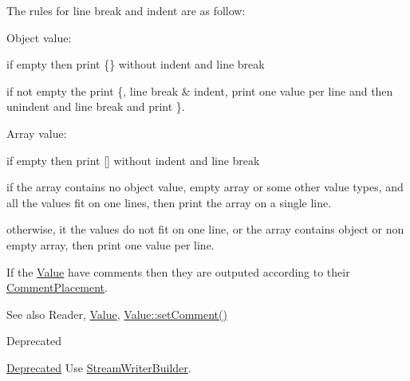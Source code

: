 The rules for line break and indent are as follow\+:
\begin{DoxyItemize}
\item Object value\+:
\begin{DoxyItemize}
\item if empty then print \{\} without indent and line break
\item if not empty the print \textquotesingle{}\{\textquotesingle{}, line break \& indent, print one value per line and then unindent and line break and print \textquotesingle{}\}\textquotesingle{}.
\end{DoxyItemize}
\item Array value\+:
\begin{DoxyItemize}
\item if empty then print \mbox{[}\mbox{]} without indent and line break
\item if the array contains no object value, empty array or some other value types, and all the values fit on one lines, then print the array on a single line.
\item otherwise, it the values do not fit on one line, or the array contains object or non empty array, then print one value per line.
\end{DoxyItemize}
\end{DoxyItemize}

If the \hyperlink{classJson_1_1Value}{Value} have comments then they are outputed according to their \hyperlink{namespaceJson_a4fc417c23905b2ae9e2c47d197a45351}{Comment\+Placement}.

\begin{DoxySeeAlso}{See also}
Reader, \hyperlink{classJson_1_1Value}{Value}, \hyperlink{classJson_1_1Value_a29f3a30f7e5d3af6f38d57999bf5b480}{Value\+::set\+Comment()} 
\end{DoxySeeAlso}
\begin{DoxyRefDesc}{Deprecated}
\item[\hyperlink{deprecated__deprecated000010}{Deprecated}]Use \hyperlink{classJson_1_1StreamWriterBuilder}{Stream\+Writer\+Builder}. \end{DoxyRefDesc}


